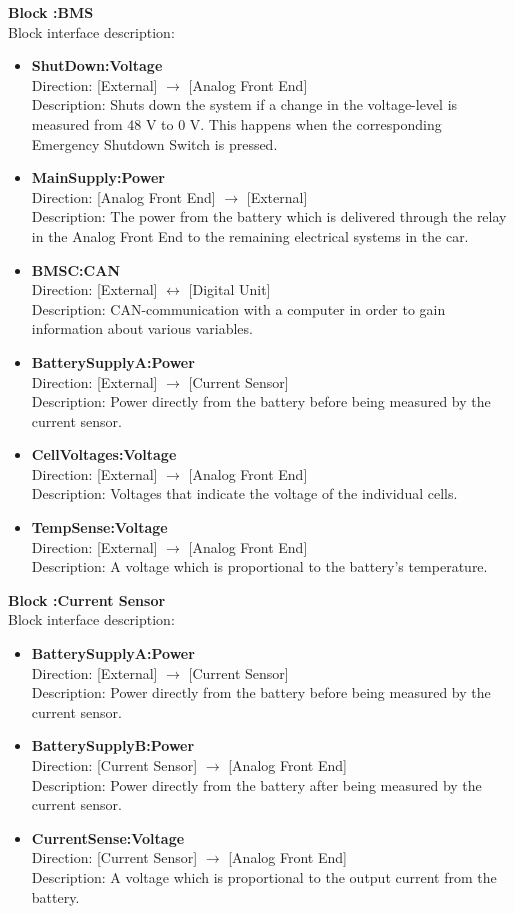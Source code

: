 \textbf{Block :BMS}\\
Block interface description:
\begin{itemize}
	\item \textbf{ShutDown:Voltage}\\
	Direction: [External] $\rightarrow$ [Analog Front End]\\
	Description: Shuts down the system if a change in the voltage-level is measured from 48 V to 0 V. This happens when the corresponding Emergency Shutdown Switch is pressed.
	\item \textbf{MainSupply:Power}\\
	Direction: [Analog Front End] $\rightarrow$ [External]\\
	Description: The power from the battery which is delivered through the relay in the Analog Front End to the remaining electrical systems in the car. 
	\item \textbf{BMSC:CAN}\\
	Direction: [External] $\leftrightarrow$ [Digital Unit]\\
	Description: CAN-communication with a computer in order to gain information about various variables.
	\item \textbf{BatterySupplyA:Power}\\
	Direction: [External] $\rightarrow$ [Current Sensor]\\
	Description: Power directly from the battery before being measured by the current sensor.
	\item \textbf{CellVoltages:Voltage}\\
	Direction: [External] $\rightarrow$ [Analog Front End]\\
	Description: Voltages that indicate the voltage of the individual cells.
	\item \textbf{TempSense:Voltage}\\
	Direction: [External] $\rightarrow$ [Analog Front End]\\
	Description: A voltage which is proportional to the battery's temperature.
\end{itemize}

\textbf{Block :Current Sensor}\\
Block interface description:
\begin{itemize}
	\item \textbf{BatterySupplyA:Power}\\
	Direction: [External] $\rightarrow$ [Current Sensor]\\
	Description: Power directly from the battery before being measured by the current sensor.
	\item \textbf{BatterySupplyB:Power}\\
	Direction: [Current Sensor] $\rightarrow$ [Analog Front End]\\
	Description: Power directly from the battery after being measured by the current sensor.
	\item \textbf{CurrentSense:Voltage}\\
	Direction: [Current Sensor] $\rightarrow$ [Analog Front End]\\
	Description: A voltage which is proportional to the output current from the battery.
\end{itemize}


